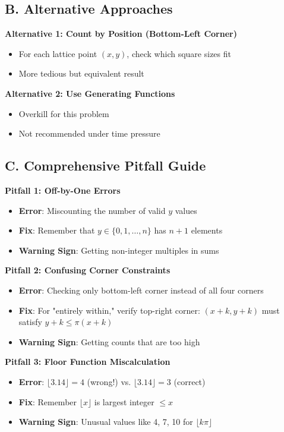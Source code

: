 \documentclass[12pt]{article}
\begin{document}
\begin{roadmapbox}
\subsection*{B. Alternative Approaches}

\textbf{Alternative 1: Count by Position (Bottom-Left Corner)}
\begin{itemize}
    \item For each lattice point $(x, y)$, check which square sizes fit
    \item More tedious but equivalent result
\end{itemize}

\textbf{Alternative 2: Use Generating Functions}
\begin{itemize}
    \item Overkill for this problem
    \item Not recommended under time pressure
\end{itemize}

\subsection*{C. Comprehensive Pitfall Guide}

\textbf{Pitfall 1: Off-by-One Errors}
\begin{itemize}
    \item \textbf{Error}: Miscounting the number of valid $y$ values
    \item \textbf{Fix}: Remember that $y \in \{0, 1, \ldots, n\}$ has $n+1$ elements
    \item \textbf{Warning Sign}: Getting non-integer multiples in sums
\end{itemize}

\textbf{Pitfall 2: Confusing Corner Constraints}
\begin{itemize}
    \item \textbf{Error}: Checking only bottom-left corner instead of all four corners
    \item \textbf{Fix}: For "entirely within," verify top-right corner: $(x+k, y+k)$ must satisfy $y+k \leq \pi(x+k)$
    \item \textbf{Warning Sign}: Getting counts that are too high
\end{itemize}

\textbf{Pitfall 3: Floor Function Miscalculation}
\begin{itemize}
    \item \textbf{Error}: $\lfloor 3.14 \rfloor = 4$ (wrong!) vs. $\lfloor 3.14 \rfloor = 3$ (correct)
    \item \textbf{Fix}: Remember $\lfloor x \rfloor$ is largest integer $\leq x$
    \item \textbf{Warning Sign}: Unusual values like 4, 7, 10 for $\lfloor k\pi \rfloor$
\end{itemize}


\end{roadmapbox}
\end{document}
